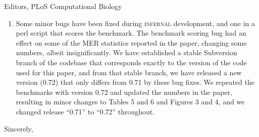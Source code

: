 \documentclass{jfrcletter}
\begin{document}
\begin{letter}{Editors, PLoS Computational Biology}
\begin{enumerate}
\item Some minor bugs have been fixed during \textsc{infernal}
     development, and one in a perl script that scores the
     benchmark. The benchmark scoring bug had an effect on some of the
     MER statistics reported in the paper, changing some numbers,
     albeit insignificantly.  We have established a stable Subversion
     branch of the codebase that corresponds exactly to the version of
     the code used for this paper, and from that stable branch, we
     have released a new version (0.72) that only differs from 0.71 by
     these bug fixes. We repeated the benchmarks with version 0.72 and
     updated the numbers in the paper, resulting in minor changes to
     Tables 5 and 6 and Figures 3 and 4, and we changed release
     ``0.71'' to ``0.72'' throughout.
\end{enumerate}

\closing{Sincerely,}

\end{letter}
\end{document}
